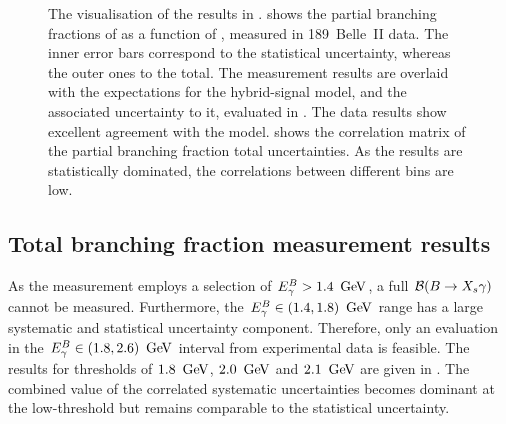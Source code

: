 \begin{figure}[htbp!]
    \centering
    \caption{\label{fig:partial_and_correlation} 
    The visualisation of the results in .
     shows the partial branching fractions of \BtoXsgamma 
    as a function of \EB, measured in 189~\invfb Belle~II data.
    The inner error bars correspond to the statistical uncertainty, whereas the outer ones to the total.
    The measurement results are overlaid with the expectations for the hybrid-signal model, and the associated uncertainty to it, evaluated in .
    The data results show excellent agreement with the model.
     shows 
    the correlation matrix of the partial branching fraction total uncertainties.
    As the results are statistically dominated, the correlations between different \EB bins are low.
    }
\end{figure}

\subsection{Total branching fraction measurement results}\label{sec:total_branching_fraction_results}

As the measurement employs a selection of ${E^B_{\gamma}}>1.4~\mathrm{\,Ge\kern -0.1em V}$, a full $\mathcal{B}(\BtoXsgamma)$ cannot be measured.
Furthermore, the ${E^B_{\gamma}}\in(1.4,1.8)~\mathrm{\,Ge\kern -0.1em V}$ range has a large systematic and statistical uncertainty component.
Therefore, only an evaluation in the ${E^B_{\gamma}}\in(1.8,2.6)~\mathrm{\,Ge\kern -0.1em V}$ interval from experimental data is feasible.
The results for thresholds of $1.8~\mathrm{\,Ge\kern -0.1em V}$, $2.0~\mathrm{\,Ge\kern -0.1em V}$ and $2.1~\mathrm{\,Ge\kern -0.1em V}$ are given in .
The combined value of the correlated systematic uncertainties becomes dominant at the low-\EB threshold but remains comparable to the statistical uncertainty.

